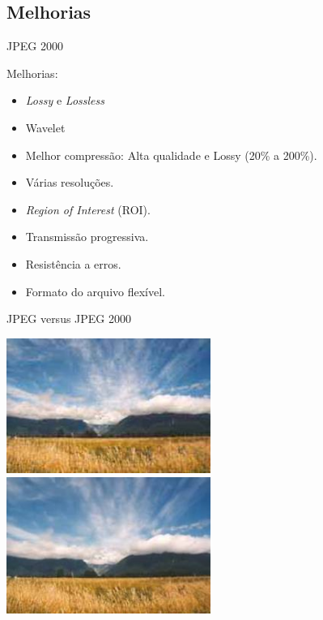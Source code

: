 \documentclass{beamer}
\begin{document}
  \subsection{Melhorias}
  \begin{frame}{JPEG 2000}
    \begin{block}{Melhorias:}
      \begin{itemize}
        \item \emph{Lossy} e \emph{Lossless}
        \item Wavelet
        \item Melhor compressão: Alta qualidade e Lossy (20\% a 200\%).
        \item Várias resoluções.
        \item \emph{Region of Interest} (ROI).
        \item Transmissão progressiva.
        \item Resistência a erros.
        \item Formato do arquivo flexível.
      \end{itemize}
    \end{block}
  \end{frame}
  \begin{frame}{JPEG versus JPEG 2000}
    \begin{multicols}{2}
      \includegraphics[width=0.5\textwidth]{figure/ex_jpeg_01.jpg}
      \includegraphics[width=0.5\textwidth]{figure/ex_jpeg2k_01_2.jpg}
    \end{multicols}
  \end{frame}
\end{document}
